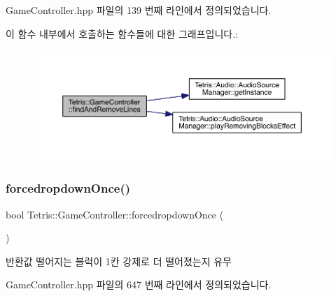 Game\+Controller.\+hpp 파일의 139 번째 라인에서 정의되었습니다.

이 함수 내부에서 호출하는 함수들에 대한 그래프입니다.\+:
\nopagebreak
\begin{figure}[H]
\begin{center}
\leavevmode
\includegraphics[width=350pt]{class_tetris_1_1_game_controller_ab19e8563acc9e724e130de60f87600b7_cgraph}
\end{center}
\end{figure}
\mbox{\label{class_tetris_1_1_game_controller_a035e352a85db58a05322156af606f0fa}} 
\subsubsection{\texorpdfstring{forcedropdown\+Once()}{forcedropdownOnce()}}
{\footnotesize\ttfamily bool Tetris\+::\+Game\+Controller\+::forcedropdown\+Once (\begin{DoxyParamCaption}{ }\end{DoxyParamCaption})\hspace{0.3cm}{\ttfamily [inline]}}

\begin{DoxyReturn}{반환값}
떨어지는 블럭이 1칸 강제로 더 떨어졌는지 유무 
\end{DoxyReturn}


Game\+Controller.\+hpp 파일의 647 번째 라인에서 정의되었습니다.

